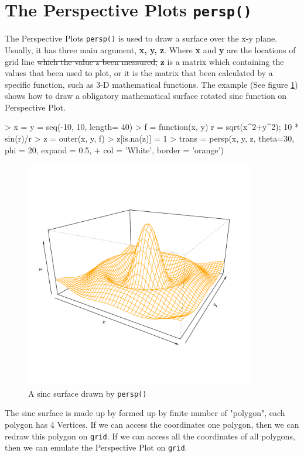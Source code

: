 \documentclass[paper=a4, fontsize=11pt]{report}
\begin{document}
\section{The Perspective Plots \texttt{persp()}}
The Perspective Plots \texttt{persp()} is used to draw a surface over the x-y plane. Usually, it has three main argument, \textbf{x, y, z}. Where \textbf{x} and \textbf{y} are the locations of grid line \st{which the value z been measured,} \textbf{z} is a matrix which containing the values that been used to plot, or it is the matrix that been calculated by a specific function, such as 3-D mathematical functions. The example (See figure \ref{figure_3.1}) shows how to draw a obligatory mathematical surface rotated sinc function on Perspective Plot.
\begin{Schunk}
\begin{Sinput}
> x = y = seq(-10, 10, length= 40)
> f = function(x, y) { r = sqrt(x^2+y^2); 10 * sin(r)/r }
> z = outer(x, y, f)
> z[is.na(z)] = 1
> trans = persp(x, y, z, theta=30, phi = 20, expand = 0.5,
+ col = 'White', border = 'orange')
\end{Sinput}
\end{Schunk}
\begin{figure}[h]
	\begin{center}
		\includegraphics[height = 10cm, width = 10cm]{figure/standalone_1.pdf}
		\caption{A sinc surface drawn by \texttt{persp()}}
		\label{figure_3.1}
	\end{center}
\end{figure}

The sinc surface is made up by formed up by finite number of "polygon", each polygon has 4 Vertices. If we can access the coordinates one polygon, then we can redraw this polygon on \texttt{grid}. If we can access all the coordinates of all polygons, then we can emulate the Perspective Plot on \texttt{grid}. \\
\end{document}
